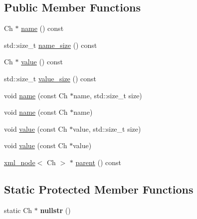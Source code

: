 \subsection*{Public Member Functions}
\begin{DoxyCompactItemize}
\item 
Ch $\ast$ \hyperlink{classrapidxml_1_1xml__base_aef8ae147fbee59209f714274afc80dc4}{name} () const
\item 
std\+::size\+\_\+t \hyperlink{classrapidxml_1_1xml__base_a20c8ffbe0c7a0b4231681ab8b99330a4}{name\+\_\+size} () const
\item 
Ch $\ast$ \hyperlink{classrapidxml_1_1xml__base_a6af65de5e59ac497cd69838f8a89d602}{value} () const
\item 
std\+::size\+\_\+t \hyperlink{classrapidxml_1_1xml__base_a2eb123d471b1567fa4832b6ee2b75493}{value\+\_\+size} () const
\item 
void \hyperlink{classrapidxml_1_1xml__base_ae55060ae958c6e6465d6c8db852ec6ce}{name} (const Ch $\ast$name, std\+::size\+\_\+t size)
\item 
void \hyperlink{classrapidxml_1_1xml__base_a4611ddc82ac83a527c65606600eb2a0d}{name} (const Ch $\ast$name)
\item 
void \hyperlink{classrapidxml_1_1xml__base_a3b183c2db7022a6d30494dd2f0ac11e9}{value} (const Ch $\ast$value, std\+::size\+\_\+t size)
\item 
void \hyperlink{classrapidxml_1_1xml__base_a81e63ec4bfd2d7ef0a6c2ed49be6e623}{value} (const Ch $\ast$value)
\item 
\hyperlink{classrapidxml_1_1xml__node}{xml\+\_\+node}$<$ Ch $>$ $\ast$ \hyperlink{classrapidxml_1_1xml__base_aa807062868d671a8c798d9d1bf016988}{parent} () const
\end{DoxyCompactItemize}
\subsection*{Static Protected Member Functions}
\begin{DoxyCompactItemize}
\item 
\mbox{\label{classrapidxml_1_1xml__base_ad96ff6b1e41dab3ff60b9bc4df769a75}} 
static Ch $\ast$ {\bfseries nullstr} ()
\end{DoxyCompactItemize}
